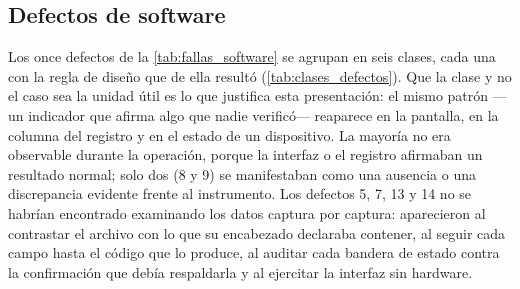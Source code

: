 \subsection{Defectos de software}
\label{sec:fallas_software}

Los once defectos de la \cref{tab:fallas_software} se agrupan en seis
clases, cada una con la regla de diseño que de ella resultó
(\cref{tab:clases_defectos}). Que la clase y no el caso sea la unidad
útil es lo que justifica esta presentación: el mismo patrón ---un
indicador que afirma algo que nadie verificó--- reaparece en la
pantalla, en la columna del registro y en el estado de un dispositivo.
La mayoría no era observable durante la operación, porque la interfaz o
el registro afirmaban un resultado normal; solo dos (8 y 9)
se manifestaban como una ausencia o una discrepancia evidente frente al
instrumento. Los defectos 5, 7, 13 y 14 no se habrían encontrado
examinando los datos captura por captura: aparecieron al contrastar el
archivo con lo que su encabezado declaraba contener, al seguir cada
campo hasta el código que lo produce, al auditar cada bandera de estado
contra la confirmación que debía respaldarla y al ejercitar la interfaz
sin hardware.

